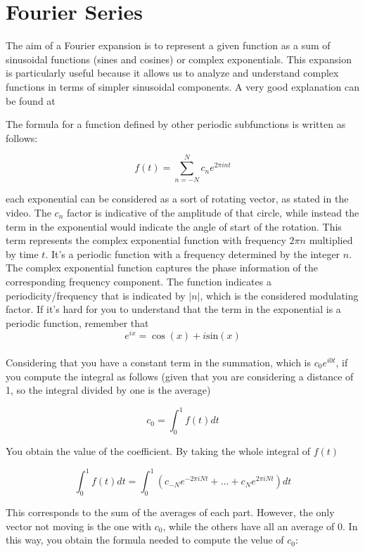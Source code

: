 \section{Fourier Series} \label{chap: fourier}

The aim of a Fourier expansion is to represent a given function as a sum of sinusoidal functions (sines and cosines) or complex exponentials. This expansion is particularly useful because it allows us to analyze and understand complex functions in terms of simpler sinusoidal components. A very good explanation can be found at

The formula for a function defined by other periodic subfunctions is written as follows:

\begin{equation}
    f(t) = \sum_{n = -N}^{N}{c_n e^{2 \pi int}}
\end{equation}

each exponential can be considered as a sort of rotating vector, as stated in the video. The $c_n$ factor is indicative of the amplitude of that circle, while instead the term in the exponential would indicate the angle of start of the rotation. This term represents the complex exponential function with frequency $2 \pi n$ multiplied by time $t$. It's a periodic function with a frequency determined by the integer $n$. The complex exponential function captures the phase information of the corresponding frequency component. The function indicates a periodicity/frequency that is indicated by $|n|$, which is the considered modulating factor.
If it's hard for you to understand that the term in the exponential is a periodic function, remember that
$$
e^{ix} = \cos{(x)} + i \text{sin}(x)
$$
\\
Considering that you have a constant term in the summation, which is $c_0 e^{i0t}$, if you compute the integral as follows (given that you are considering a distance of 1, so the integral divided by one is the average)

$$
c_0 = \int_0^1{f(t)dt}
$$

You obtain the value of the coefficient. By taking the whole integral of $f(t)$

$$
\int_0^1{f(t)dt} = \int_0^1{(c_{-N} e^{-2 \pi iNt} + \dots + c_{N} e^{2 \pi iNt})dt}
$$

This corresponds to the sum of the averages of each part. However, the only vector not moving is the one with $c_0$, while the others have all an average of 0. In this way, you obtain the formula needed to compute the velue of $c_0$:

